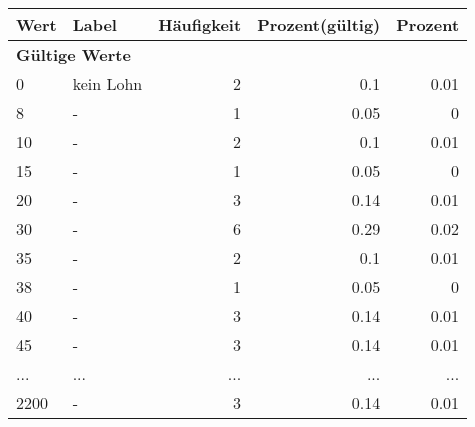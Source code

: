      \begin{longtable}{lXrrr}
     \toprule
     \textbf{Wert} & \textbf{Label} & \textbf{Häufigkeit} & \textbf{Prozent(gültig)} & \textbf{Prozent} \\
     \endhead
     \midrule
     \multicolumn{5}{l}{\textbf{Gültige Werte}}\\
        0 & \multicolumn{1}{X}{kein Lohn} & %
          \num{2} &
          \num[round-mode=places,round-precision=2]{0,1} &
          \num[round-mode=places,round-precision=2]{0,01} \\
        8 & \multicolumn{1}{X}{-} & %
          \num{1} &
          \num[round-mode=places,round-precision=2]{0,05} &
          \num[round-mode=places,round-precision=2]{0} \\
        10 & \multicolumn{1}{X}{-} & %
          \num{2} &
          \num[round-mode=places,round-precision=2]{0,1} &
          \num[round-mode=places,round-precision=2]{0,01} \\
        15 & \multicolumn{1}{X}{-} & %
          \num{1} &
          \num[round-mode=places,round-precision=2]{0,05} &
          \num[round-mode=places,round-precision=2]{0} \\
        20 & \multicolumn{1}{X}{-} & %
          \num{3} &
          \num[round-mode=places,round-precision=2]{0,14} &
          \num[round-mode=places,round-precision=2]{0,01} \\
        30 & \multicolumn{1}{X}{-} & %
          \num{6} &
          \num[round-mode=places,round-precision=2]{0,29} &
          \num[round-mode=places,round-precision=2]{0,02} \\
        35 & \multicolumn{1}{X}{-} & %
          \num{2} &
          \num[round-mode=places,round-precision=2]{0,1} &
          \num[round-mode=places,round-precision=2]{0,01} \\
        38 & \multicolumn{1}{X}{-} & %
          \num{1} &
          \num[round-mode=places,round-precision=2]{0,05} &
          \num[round-mode=places,round-precision=2]{0} \\
        40 & \multicolumn{1}{X}{-} & %
          \num{3} &
          \num[round-mode=places,round-precision=2]{0,14} &
          \num[round-mode=places,round-precision=2]{0,01} \\
        45 & \multicolumn{1}{X}{-} & %
          \num{3} &
          \num[round-mode=places,round-precision=2]{0,14} &
          \num[round-mode=places,round-precision=2]{0,01} \\
       ... & ... & ... & ... & ... \\
        2200 & \multicolumn{1}{X}{-} & %
          \num{3} &
          \num[round-mode=places,round-precision=2]{0,14} &
          \num[round-mode=places,round-precision=2]{0,01} \\


\end{longtable}
